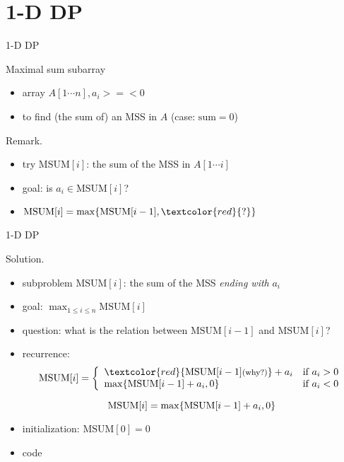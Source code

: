 \section{1-D DP}

\begin{frame}{1-D DP}
  \begin{exampleblock}{Maximal sum subarray }
    \begin{itemize}
      \item array $A[1 \cdots n], a_{i} >=< 0$
      \item to find (the sum of) an MSS in $A$ (case: $\text{sum} = 0$)
    \end{itemize}
  \end{exampleblock}

  \begin{alertblock}{Remark.}
    \begin{itemize}
      \item try $\text{MSUM}[i]$: the sum of the MSS in $A[1 \cdots i]$
      \item goal: is $a_{i} \in \text{MSUM}[i]$?
      \item $\text{MSUM}[i] = \max \set{\text{MSUM}[i-1], \textcolor{red}{?}}$
    \end{itemize}
  \end{alertblock}
\end{frame}
\begin{frame}{1-D DP}
  \begin{block}{Solution.}
    \begin{itemize}
      \item subproblem $\text{MSUM}[i]$: the sum of the MSS \emph{ending with} $a_{i}$
      \item goal: $\max_{1 \le i \le n} \text{MSUM}[i]$
      \item question: what is the relation between $\text{MSUM}[i-1]$ and $\text{MSUM}[i]$?
      \item recurrence: 
	\begin{displaymath}
	  \text{MSUM}[i] = \left\{ \begin{array}{ll}
	    \textcolor{red}{\text{MSUM}[i-1] \text{\footnotesize (why?)}} + a_{i} & \textrm{if $a_{i} > 0$}\\
	    \max \set{\text{MSUM}[i-1] + a_{i}, 0} & \textrm{if $a_{i} < 0$}
	  \end{array} \right.
	\end{displaymath}

	\[ \text{MSUM}[i] = \max \{\text{MSUM}[i-1] + a_{i}, 0\} \]
      \item initialization: $\text{MSUM}[0] = 0$
      \item code
    \end{itemize}
  \end{block}
\end{frame}
